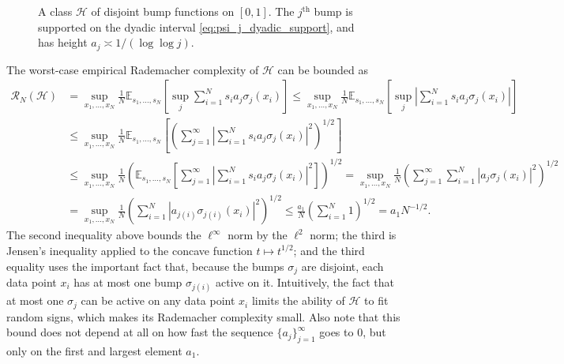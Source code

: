 \documentclass{article}
\def\cH{{\mathcal{H}}}
\def\cR{{\mathcal{R}}}
\def\bE{{\mathbb{E}}}
\begin{document}
\begin{appendices}
\begin{figure}
    \caption{A class $\cH$ of disjoint bump functions on $[0,1]$. The $j^\textrm{th}$ bump is supported on the dyadic interval \eqref{eq:psi_j_dyadic_support}, and has height $a_j \asymp 1/(\log \log j)$.}
    \label{fig:class_H}
\end{figure}

The worst-case empirical Rademacher complexity of $\cH$ can be bounded as
\begin{align}
    \cR_N(\cH) &= \sup_{x_1, \dots, x_N} \frac{1}{N} \bE_{s_1, \dots, s_N} \left[ \sup_j  \sum_{i=1}^N s_i a_j \sigma_j (x_i) \right] \leq \sup_{x_1, \dots, x_N} \frac{1}{N} \bE_{s_1, \dots, s_N} \left[ \sup_j \left|  \sum_{i=1}^N s_i a_j \sigma_j (x_i) \right| \right] \\
    &\leq \sup_{x_1, \dots, x_N} \frac{1}{N} \bE_{s_1, \dots, s_N} \left[ \left( \sum_{j=1}^\infty  \left|  \sum_{i=1}^N s_i a_j \sigma_j (x_i) \right|^2 \right)^{1/2} \right] \\
    &\leq \sup_{x_1, \dots, x_N} \frac{1}{N} \left(  \bE_{s_1, \dots, s_N} \left[ \sum_{j=1}^\infty  \left|  \sum_{i=1}^N s_i a_j \sigma_j (x_i) \right|^2 \right] \right)^{1/2} = \sup_{x_1, \dots, x_N} \frac{1}{N} \left(  \sum_{j=1}^\infty  \sum_{i=1}^N |a_j \sigma_j(x_i)|^2  \right)^{1/2} \\
    &= \sup_{x_1, \dots, x_N} \frac{1}{N} \left(       \sum_{i=1}^N  \left| a_{j(i)} \sigma_{j(i)} (x_i) \right|^2 \right)^{1/2} \leq \frac{a_1}{N} \left( \sum_{i=1}^N 1 \right)^{1/2} = a_1 N^{-1/2}.
\end{align}
The second inequality above bounds the $\ell^\infty$ norm by the $\ell^2$ norm; the third is Jensen's inequality applied to the concave function $t \mapsto t^{1/2}$; and the third equality uses the important fact that, because the bumps $\sigma_j$ are disjoint, each data point $x_i$ has at most one bump $\sigma_{j(i)}$ active on it. Intuitively, the fact that at most one $\sigma_j$ can be active on any data point $x_i$ limits the ability of $\cH$ to fit random signs, which makes its Rademacher complexity small. Also note that this bound does not depend at all on how fast the sequence $\{ a_j \}_{j=1}^\infty$ goes to 0, but only on the first and largest element $a_1$.


\end{appendices}
\end{document}
